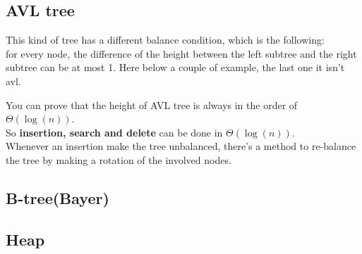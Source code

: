 \documentclass{article}
\begin{document}
\subsection{AVL tree}
This kind of tree has a different balance condition, which is the following:\\
for every node, the difference of the height between the left subtree and the right subtree can be at most 1. Here below a couple of example, the last one it isn't avl.\\
You can prove that the height of AVL tree is always in the order of $\Theta(\log(n))$.\\
So \textbf{insertion, search and delete} can be done in $\Theta(\log(n))$.\\
Whenever an insertion make the tree unbalanced, there's a method to re-balance the tree by making a rotation of the involved nodes. 
\subsection{B-tree(Bayer)}

\subsection{Heap}
\end{document}
